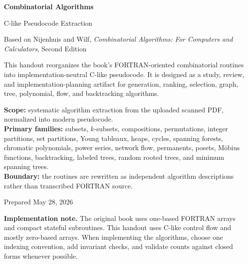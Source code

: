 \documentclass[11pt]{article}
\begin{document}
\hypersetup{pageanchor=false}

\begin{titlepage}
  \centering
  \vspace*{1.7cm}
  {\Huge\bfseries\color{CABlue}Combinatorial Algorithms\par}
  \vspace{0.35cm}
  {\LARGE C-like Pseudocode Extraction\par}
  \vspace{0.25cm}
  {\large Based on Nijenhuis and Wilf, \textit{Combinatorial Algorithms: For Computers and Calculators}, Second Edition\par}
  \vspace{1.0cm}
  \begin{scopebox}
  This handout reorganizes the book's FORTRAN-oriented combinatorial routines into implementation-neutral C-like pseudocode. It is designed as a study, review, and implementation-planning artifact for generation, ranking, selection, graph, tree, polynomial, flow, and backtracking algorithms.
  \end{scopebox}
  \vspace{0.75cm}
  \begin{methodbox}
  \textbf{Scope:} systematic algorithm extraction from the uploaded scanned PDF, normalized into modern pseudocode.\\
  \textbf{Primary families:} subsets, $k$-subsets, compositions, permutations, integer partitions, set partitions, Young tableaux, heaps, cycles, spanning forests, chromatic polynomials, power series, network flow, permanents, posets, M\"obius functions, backtracking, labeled trees, random rooted trees, and minimum spanning trees.\\
  \textbf{Boundary:} the routines are rewritten as independent algorithm descriptions rather than transcribed FORTRAN source.
  \end{methodbox}
  \vfill
  {\large Prepared May 28, 2026\par}
\end{titlepage}

\hypersetup{pageanchor=true}
\tableofcontents
\clearpage
{}

\begin{warningbox}
\textbf{Implementation note.} The original book uses one-based FORTRAN arrays and compact stateful subroutines. This handout uses C-like control flow and mostly zero-based arrays. When implementing the algorithms, choose one indexing convention, add invariant checks, and validate counts against closed forms whenever possible.
\end{warningbox}
\end{document}
